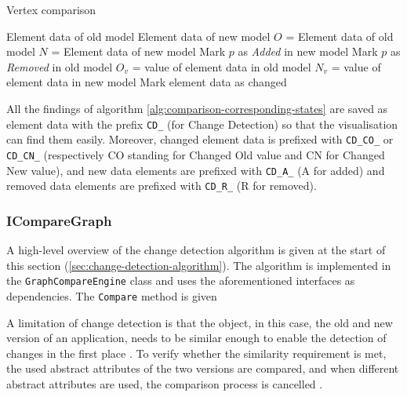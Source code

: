 \begin{algorithm}
    \caption{Vertex comparison}\label{alg:comparison-corresponding-states}
    \begin{algorithmic}
        \Require Element data of old model
        \Require Element data of new model
        \State $O$ = Element data of old model
        \State $N$ = Element data of new model
            \State Mark $p$ as \textit{Added} in new model
        \EndFor
            \State Mark $p$ as \textit{Removed} in old model
        \EndFor
            \State $O_v$ = value of element data in old model
            \State $N_v$ = value of element data in new model
               \State Mark element data as changed 
            \EndIf
        \EndFor
    \end{algorithmic}
\end{algorithm}

All the findings of algorithm \ref{alg:comparison-corresponding-states} are saved as element data with the prefix \verb|CD_| (for Change Detection) so that the visualisation can find them easily. Moreover, changed element data is prefixed with \verb|CD_CO_| or \verb|CD_CN_| (respectively CO standing for Changed Old value and CN for Changed New value), and new data elements are prefixed with \verb|CD_A_| (A for added) and removed data elements are prefixed with \verb|CD_R_| (R for removed).
\newpage
\subsubsection{ICompareGraph} \label{sec:compare-algorithm}
A high-level overview of the change detection algorithm is given at the start of this section (\ref{sec:change-detection-algorithm}). The algorithm is implemented in the \verb|GraphCompareEngine| class and uses the aforementioned interfaces as dependencies. The \verb|Compare| method is given 

A limitation of change detection is that the object, in this case, the old and new version of an application, needs to be similar enough to enable the detection of changes in the first place \cite{andrews2009visual}. To verify whether the similarity requirement is met, the used abstract attributes of the two versions are compared, and when different abstract attributes are used, the comparison process is cancelled \cite{stateDiff}. 